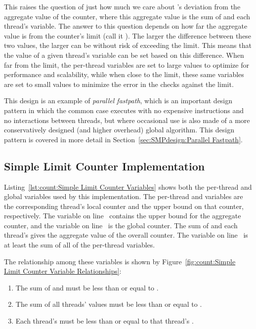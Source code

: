This raises the question of just how much we care about 's
deviation from the aggregate value of the counter, where this aggregate value
is the sum of  and each thread's  variable.
The answer to this question depends on how far the aggregate value is
from the counter's limit (call it ).
The larger the difference between these two values, the larger 
can be without risk of exceeding the  limit.
This means that the
value of a given thread's  variable can be set
based on this difference.
When far from the limit, the  per-thread variables are
set to large values to optimize for performance and scalability, while
when close to the limit, these same variables are set to small values
to minimize the error in the checks against the  limit.

This design is an example of \emph{parallel fastpath}, which is an important
design pattern in which the common case executes with no expensive
instructions and no interactions between threads, but where occasional
use is also made of a more conservatively designed
(and higher overhead) global algorithm.
This design pattern is covered in more detail in
Section~\ref{sec:SMPdesign:Parallel Fastpath}.

\subsection{Simple Limit Counter Implementation}
\label{sec:count:Simple Limit Counter Implementation}

\begin{fcvref}
Listing~\ref{lst:count:Simple Limit Counter Variables}
shows both the per-thread and global variables used by this
implementation.
The per-thread  and  variables are the
corresponding thread's local counter and the upper bound on that
counter, respectively.
The  variable on
line~ contains the upper
bound for the aggregate counter, and the  variable
on line~ is the global counter.
The sum of  and each thread's  gives
the aggregate value of the overall counter.
The  variable on
line~ is at least the sum of all of the
per-thread  variables.
\end{fcvref}
The relationship among these variables is shown by
Figure~\ref{fig:count:Simple Limit Counter Variable Relationships}:
\begin{enumerate}
\item	The sum of  and  must
	be less than or equal to .
\item	The sum of all threads'  values must be
	less than or equal to .
\item	Each thread's  must be less than or equal to
	that thread's .
\end{enumerate}

